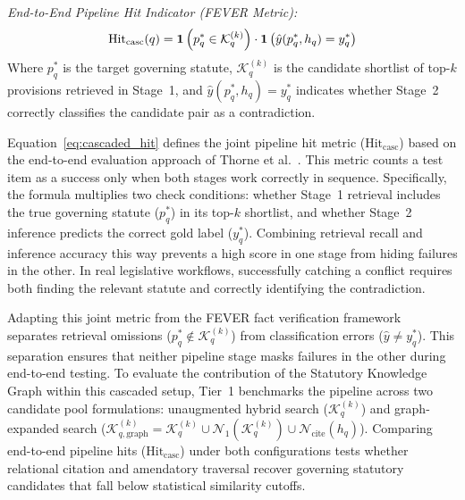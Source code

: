     \noindent\textit{End-to-End Pipeline Hit Indicator (FEVER Metric):}
    \begin{equation}
        \text{Hit}_{\text{casc}}(q) = \mathbf{1}\left(p_q^* \in \mathcal{K}_q^{(k)}\right) \cdot \mathbf{1}\left(\hat{y}(p_q^*, h_q) = y_q^*\right)
        \label{eq:cascaded_hit}
        \eqcaption{End-to-End Pipeline Hit Indicator (FEVER Metric)}
    \end{equation}
    \noindent Where $p_q^*$ is the target governing statute, $\mathcal{K}_q^{(k)}$ is the candidate shortlist of top-$k$ provisions retrieved in Stage~1, and $\hat{y}(p_q^*, h_q) = y_q^*$ indicates whether Stage~2 correctly classifies the candidate pair as a contradiction.

    Equation~\ref{eq:cascaded_hit} defines the joint pipeline hit metric ($\text{Hit}_{\text{casc}}$) based on the end-to-end evaluation approach of Thorne et al.~\cite{thorne2018fever}. This metric counts a test item as a success only when both stages work correctly in sequence. Specifically, the formula multiplies two check conditions: whether Stage~1 retrieval includes the true governing statute ($p_q^*$) in its top-$k$ shortlist, and whether Stage~2 inference predicts the correct gold label ($y_q^*$). Combining retrieval recall and inference accuracy this way prevents a high score in one stage from hiding failures in the other. In real legislative workflows, successfully catching a conflict requires both finding the relevant statute and correctly identifying the contradiction.

    Adapting this joint metric from the FEVER fact verification framework~\cite{thorne2018fever} separates retrieval omissions ($p_q^* \notin \mathcal{K}_q^{(k)}$) from classification errors ($\hat{y} \neq y_q^*$). This separation ensures that neither pipeline stage masks failures in the other during end-to-end testing. To evaluate the contribution of the Statutory Knowledge Graph within this cascaded setup, Tier~1 benchmarks the pipeline across two candidate pool formulations: unaugmented hybrid search ($\mathcal{K}_q^{(k)}$) and graph-expanded search ($\mathcal{K}_{q, \text{graph}}^{(k)} = \mathcal{K}_q^{(k)} \cup \mathcal{N}_1(\mathcal{K}_q^{(k)}) \cup \mathcal{N}_{\text{cite}}(h_q)$). Comparing end-to-end pipeline hits ($\text{Hit}_{\text{casc}}$) under both configurations tests whether relational citation and amendatory traversal recover governing statutory candidates that fall below statistical similarity cutoffs.

